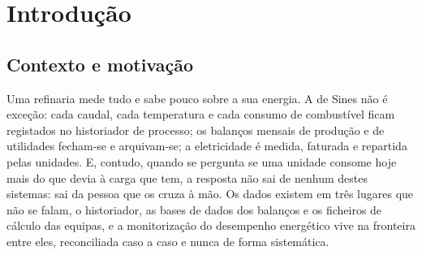 
\chapter{Introdução}
\label{cha:introducao}

\section{Contexto e motivação}
\label{sec:contexto}

Uma refinaria mede tudo e sabe pouco sobre a sua energia. A de Sines
não é exceção: cada caudal, cada temperatura e cada consumo de
combustível ficam registados no historiador de processo; os balanços
mensais de produção e de utilidades fecham-se e arquivam-se; a
eletricidade é medida, faturada e repartida pelas unidades. E, contudo,
quando se pergunta se uma unidade consome hoje mais do que devia à carga
que tem, a resposta não sai de nenhum destes sistemas: sai da pessoa que
os cruza à mão.
Os dados existem em três lugares que não se falam, o
historiador, as bases de dados dos balanços e os ficheiros de cálculo
das equipas, e a monitorização do desempenho energético vive na
fronteira entre eles, reconciliada caso a caso e nunca de forma
sistemática.

